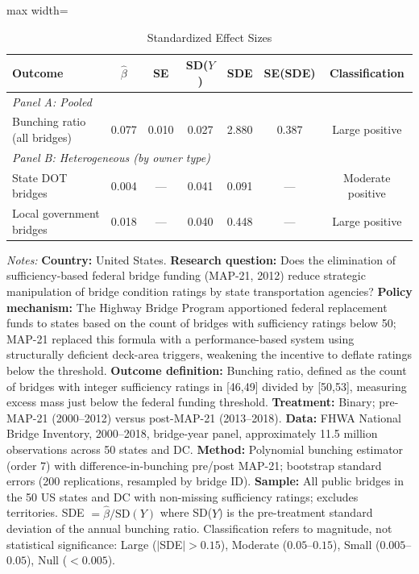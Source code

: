 \begin{table}[htbp]
\centering
\caption{Standardized Effect Sizes}
\label{tab:sde}
\begin{adjustbox}{max width=\textwidth}
\begin{tabular}{lcccccc}
\hline\hline
Outcome & $\hat{\beta}$ & SE & SD($Y$) & SDE & SE(SDE) & Classification \\
\hline
\multicolumn{7}{l}{\textit{Panel A: Pooled}} \\
Bunching ratio (all bridges) & 0.077 & 0.010 & 0.027 & 2.880 & 0.387 & Large positive \\
[6pt]
\multicolumn{7}{l}{\textit{Panel B: Heterogeneous (by owner type)}} \\
State DOT bridges & 0.004 & --- & 0.041 & 0.091 & --- & Moderate positive \\
Local government bridges & 0.018 & --- & 0.040 & 0.448 & --- & Large positive \\
\hline\hline
\end{tabular}
\end{adjustbox}
\begin{tablenotes}[flushleft]\footnotesize
\item \textit{Notes:}
\textbf{Country:} United States.
\textbf{Research question:} Does the elimination of sufficiency-based federal bridge funding (MAP-21, 2012) reduce strategic manipulation of bridge condition ratings by state transportation agencies?
\textbf{Policy mechanism:} The Highway Bridge Program apportioned federal replacement funds to states based on the count of bridges with sufficiency ratings below 50; MAP-21 replaced this formula with a performance-based system using structurally deficient deck-area triggers, weakening the incentive to deflate ratings below the threshold.
\textbf{Outcome definition:} Bunching ratio, defined as the count of bridges with integer sufficiency ratings in [46,49] divided by [50,53], measuring excess mass just below the federal funding threshold.
\textbf{Treatment:} Binary; pre-MAP-21 (2000--2012) versus post-MAP-21 (2013--2018).
\textbf{Data:} FHWA National Bridge Inventory, 2000--2018, bridge-year panel, approximately 11.5 million observations across 50 states and DC.
\textbf{Method:} Polynomial bunching estimator (order 7) with difference-in-bunching pre/post MAP-21; bootstrap standard errors (200 replications, resampled by bridge ID).
\textbf{Sample:} All public bridges in the 50 US states and DC with non-missing sufficiency ratings; excludes territories.
SDE $= \hat{\beta} / \text{SD}(Y)$ where SD($Y$) is the pre-treatment standard deviation of the annual bunching ratio. Classification refers to magnitude, not statistical significance: Large ($|$SDE$| > 0.15$), Moderate ($0.05$--$0.15$), Small ($0.005$--$0.05$), Null ($< 0.005$).
\end{tablenotes}
\end{table}


